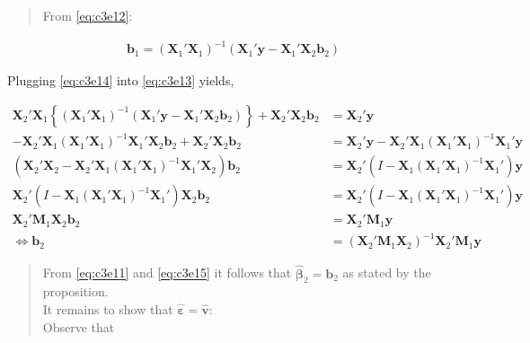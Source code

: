 \documentclass[
]{book}
\begin{document}
\begin{quote}
From \eqref{eq:c3e12}:
\end{quote}

\begin{align}
\mathbf{b}_1 = \left(\mathbf{X}_1'\mathbf{X}_1\right)^{-1}\left(\mathbf{X}_1'\mathbf{y} - \mathbf{X}_1'\mathbf{X}_2\mathbf{b}_2\right)
\label{eq:c3e14}
\end{align}

Plugging \eqref{eq:c3e14} into \eqref{eq:c3e13} yields,

\begin{align}
\mathbf{X}_2'\mathbf{X}_1\left\{\left(\mathbf{X}_1'\mathbf{X}_1\right)^{-1}\left(\mathbf{X}_1'\mathbf{y} - \mathbf{X}_1'\mathbf{X}_2\mathbf{b}_2\right)\right\} + \mathbf{X}_2'\mathbf{X}_2\mathbf{b}_2 &=\mathbf{X}_2'\mathbf{y}\nonumber\\
- \mathbf{X}_2'\mathbf{X}_1\left(\mathbf{X}_1'\mathbf{X}_1\right)^{-1}\mathbf{X}_1'\mathbf{X}_2\mathbf{b}_2 + \mathbf{X}_2'\mathbf{X}_2\mathbf{b}_2 &=\mathbf{X}_2'\mathbf{y}- \mathbf{X}_2'\mathbf{X}_1\left(\mathbf{X}_1'\mathbf{X}_1\right)^{-1}\mathbf{X}_1'\mathbf{y}\nonumber\\
\left(\mathbf{X}_2'\mathbf{X}_2 - \mathbf{X}_2'\mathbf{X}_1\left(\mathbf{X}_1'\mathbf{X}_1\right)^{-1}\mathbf{X}_1'\mathbf{X}_2\right)\mathbf{b}_2 &=\mathbf{X}_2'\left(I- \mathbf{X}_1\left(\mathbf{X}_1'\mathbf{X}_1\right)^{-1}\mathbf{X}_1'\right)\mathbf{y}\nonumber\\
\mathbf{X}_2'\left(I - \mathbf{X}_1\left(\mathbf{X}_1'\mathbf{X}_1\right)^{-1}\mathbf{X}_1'\right)\mathbf{X}_2\mathbf{b}_2 &=\mathbf{X}_2'\left(I- \mathbf{X}_1\left(\mathbf{X}_1'\mathbf{X}_1\right)^{-1}\mathbf{X}_1'\right)\mathbf{y}\nonumber\\
\mathbf{X}_2'\mathbf{M}_1\mathbf{X}_2\mathbf{b}_2 &=\mathbf{X}_2'\mathbf{M}_1\mathbf{y}\nonumber\\
\Leftrightarrow \mathbf{b}_2 &=\left(\mathbf{X}_2'\mathbf{M}_1\mathbf{X}_2\right)^{-1}\mathbf{X}_2'\mathbf{M}_1\mathbf{y}
\label{eq:c3e15}
\end{align}

\begin{quote}
From \eqref{eq:c3e11} and \eqref{eq:c3e15} it follows that \(\hat{\boldsymbol{\beta}}_2=\mathbf{b}_2\) as stated by the proposition.\\
It remains to show that \(\hat{\boldsymbol{\varepsilon}}=\hat{\mathbf{v}}\):\\
Observe that
\end{quote}
\end{document}
